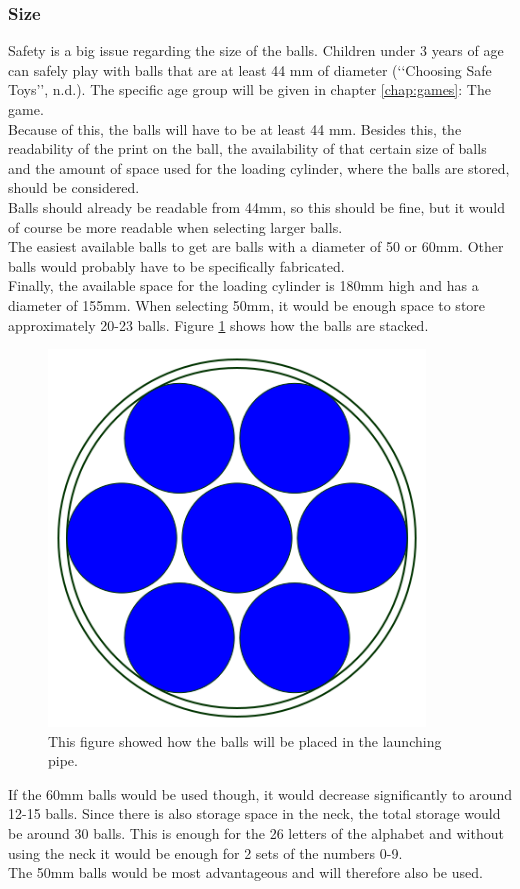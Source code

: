 \documentclass[11pt,twoside,a4paper]{report}
\begin{document}
\subsubsection{Size}
Safety is a big issue regarding the size of the balls. Children under 3 years of age can safely play with balls that are at least 44 mm of diameter (\lq\lq{}Choosing Safe Toys\rq\rq{}, n.d.). The specific age group will be given in chapter \ref{chap:games}: The game. \\
Because of this, the balls will have to be at least 44 mm. Besides this, the readability of the print on the ball, the availability of that certain size of balls and the amount of space used for the loading cylinder, where the balls are stored, should be considered. \\
Balls should already be readable from 44mm, so this should be fine, but it would of course be more readable when selecting larger balls. \\
The easiest available balls to get are balls with a diameter of 50 or 60mm. Other balls would probably have to be specifically fabricated. \\
Finally, the available space for the loading cylinder is 180mm high and has a diameter of 155mm. When selecting 50mm, it would be enough space to store approximately 20-23 balls. Figure \ref{fig:balllaunch} shows how the balls are stacked. \\
\begin{figure}[H]
\begin{center}
\includegraphics[width = 10cm]{Images/BallLaunch.png}
\caption{This figure showed how the balls will be placed in the launching pipe.}
\label{fig:balllaunch}
\end{center}
\end{figure}
If the 60mm balls would be used though, it would decrease significantly to around 12-15 balls. 
Since there is also storage space in the neck, the total storage would be around 30 balls. This is enough for the 26 letters of the alphabet and without using the neck it would be enough for 2 sets of the numbers 0-9. \\
The 50mm balls would be most advantageous and will therefore also be used. 
\end{document}
